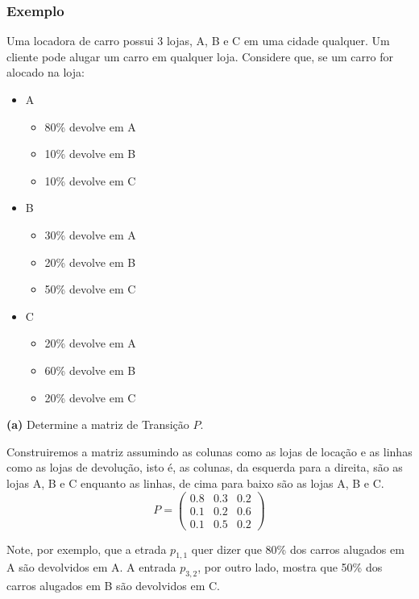\documentclass[12pt]{article}
\begin{document}
\subsubsection{Exemplo}

Uma locadora de carro possui 3 lojas, A, B e C em uma cidade qualquer. Um cliente pode alugar um carro em qualquer loja. Considere que, se um carro for alocado na loja:
\begin{itemize}
	\item A
	\begin{itemize}
		\item 80\% devolve em A
		\item 10\% devolve em B
		\item 10\% devolve em C
	\end{itemize}
	\item B
	\begin{itemize}
		\item 30\% devolve em A
		\item 20\% devolve em B
		\item 50\% devolve em C
	\end{itemize}
	\item C
	\begin{itemize}
		\item 20\% devolve em A
		\item 60\% devolve em B
		\item 20\% devolve em C
	\end{itemize}
\end{itemize}

\textbf{(a)} Determine a matriz de Transição $P$.

Construiremos a matriz assumindo as colunas como as lojas de locação e as linhas como as lojas de devolução, isto é, as colunas, da esquerda para a direita, são as lojas A, B e C enquanto as linhas, de cima para baixo são as lojas A, B e C.
\begin{equation*}P=
	\begin{pmatrix}
		0.8 & 0.3 & 0.2 \\
		0.1 & 0.2 & 0.6 \\
		0.1 & 0.5 & 0.2
	\end{pmatrix}
\end{equation*}

Note, por exemplo, que a etrada $p_{1,1}$ quer dizer que 80\% dos carros alugados em A são devolvidos em A. A entrada $p_{3,2}$, por outro lado, mostra que 50\% dos carros alugados em B são devolvidos em C.\\
\end{document}
